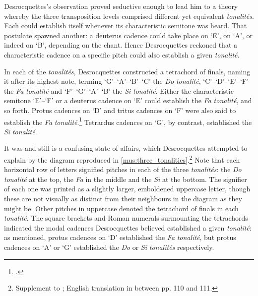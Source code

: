 Desrocquettes's observation proved seductive enough to lead him to a theory whereby the three transposition levels comprised different yet equivalent \emph{tonalités}.
Each could \mbox{establish} itself whenever its characteristic semitone was heard.
That postulate spawned another: a deuterus cadence could take place on `E', on `A', or indeed on `B', depending on the chant.
Hence Desrocquettes reckoned that a characteristic cadence on a specific pitch could also establish a given \emph{tonalité}.

In each of the \emph{tonalités}, Desrocquettes constructed a tetrachord of finals, naming it after its highest note, terming  `G'--`A'--`B'--`C' the \emph{Do} \emph{tonalité}, `C'--`D'--`E'--`F' the \emph{Fa} \emph{tonalité} and `F'--`G'--`A'--`B'\kern 1pt\flat{} the \emph{Si}\kern 1pt\flat{} \emph{tonalité}.
Either the characteristic semitone `E'--`F' or a deuterus cadence on `E' could establish the \emph{Fa} \emph{tonalité}, and so forth.
Protus cadences on `D' and tritus cadences on `F' were also said to establish the \emph{Fa} \emph{tonalité}.\footcite[208--209]{Desrocquettesaccompagnementmelodiegregorienne1923a}
Tetrardus cadences on `G', by contrast, established the \emph{Si}\kern 1pt\flat{} \emph{tonalité}.

It was and still is a confusing state of affairs, which Desrocquettes attempted to explain by the diagram reproduced in \cref{mus:three_tonalities}.\footnote{Supplement to \cite{Desrocquettesaccompagnementmelodiegregorienne1924}; English translation in \cite{PotironTreatiseAccompanimentGregorian1933} between pp. 110 and 111.}
Note that each horizontal row of letters signified pitches in each of the three \emph{tonalités}: the \emph{Do} \emph{tonalité} at the top, the \emph{Fa} in the middle and the \emph{Si}\kern 1pt\flat{} at the bottom.
The signifier of each one was printed as a slightly larger, emboldened uppercase letter, though these are not visually as distinct from their neighbours in the diagram as they might be.
Other pitches in uppercase denoted the tetrachord of finals in each \emph{tonalité}.
The square brackets and Roman numerals surmounting the tetrachords indicated the modal cadences Desrocquettes believed established a given \emph{tonalité}: as mentioned, protus cadences on `D' established the \emph{Fa} \emph{tonalité}, but protus cadences on `A' or `G' established the \emph{Do} or \emph{Si}\kern 1pt\flat{} \emph{tonalités} respectively.

